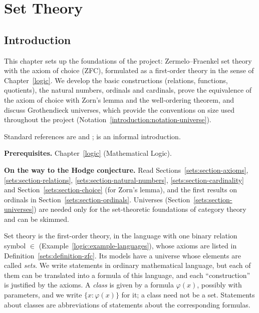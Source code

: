 \chapter{Set Theory}\label{sets}

\section{Introduction}\label{sets:section-introduction}

This chapter sets up the foundations of the project: Zermelo--Fraenkel set
theory with the axiom of choice (ZFC), formulated as a first-order theory in
the sense of Chapter~\ref{logic}. We develop the basic constructions
(relations, functions, quotients), the natural numbers, ordinals and
cardinals, prove the equivalence of the axiom of choice with Zorn's lemma and
the well-ordering theorem, and discuss Grothendieck universes, which provide
the conventions on size used throughout the project
(Notation~\ref{introduction:notation-universe}).

Standard references are \cite{jech-set-theory} and \cite{kunen-set-theory};
\cite{halmos-naive} is an informal introduction.

\noindent\textbf{Prerequisites.} Chapter~\ref{logic} (Mathematical Logic).

\noindent\textbf{On the way to the Hodge conjecture.} Read Sections~\ref{sets:section-axioms}, \ref{sets:section-relations}, \ref{sets:section-natural-numbers}, \ref{sets:section-cardinality} and Section~\ref{sets:section-choice} (for Zorn's lemma), and the first
results on ordinals in Section~\ref{sets:section-ordinals}. Universes (Section~\ref{sets:section-universes}) are needed only for the set-theoretic foundations of category theory and can be skimmed.

\begin{remark}\label{sets:remark-formal-informal}
Set theory is the first-order theory, in the language with one binary
relation symbol $\in$ (Example~\ref{logic:example-languages}), whose axioms
are listed in Definition~\ref{sets:definition-zfc}. Its models have a universe
whose elements are called \emph{sets}. We write statements in ordinary
mathematical language, but each of them can be translated into a formula of
this language, and each ``construction'' is justified by the axioms. A
\emph{class} is given by a formula $\varphi(x)$, possibly with parameters, and
we write $\{x : \varphi(x)\}$ for it; a class need not be a set. Statements
about classes are abbreviations of statements about the corresponding
formulas.
\end{remark}

